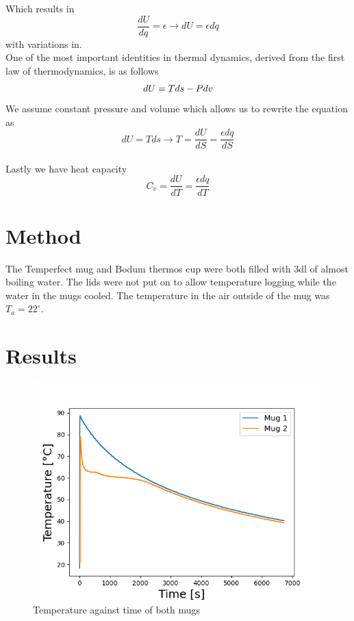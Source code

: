 \documentclass[reprint,english,notitlepage]{revtex4-2}
\begin{document}
Which results in
\begin{equation}
  \frac{dU}{dq} = \epsilon \rightarrow dU = \epsilon dq
\end{equation}
with variations in.\\

One of the most important identities in thermal dynamics, derived from the first law of thermodynamics, is as follows
\begin{equation}
dU = Tds - Pdv \\
\end{equation}
We assume constant pressure and volume which allows us to rewrite the equation as
\begin{equation}
  dU = Tds \rightarrow T = \frac{dU}{dS} = \frac{\epsilon dq}{dS}
\end{equation}
\\
Lastly we have heat capacity
\begin{equation}
C_v = \frac{dU}{dT} = \frac{\epsilon dq}{dT}
\end{equation}

\section{Method}
The Temperfect mug and Bodum thermos cup were both filled with 3dl of almost boiling water. The lids were not put on to allow temperature logging while the water in the mugs cooled. The temperature in the air outside of the mug was $T_a = 22^{\circ}$.

\section{Results}

\begin{figure}
  \includegraphics[scale=0.5]{temp.png}
  \caption{Temperature against time of both mugs}\label{figure}
\end{figure}
\end{document}
